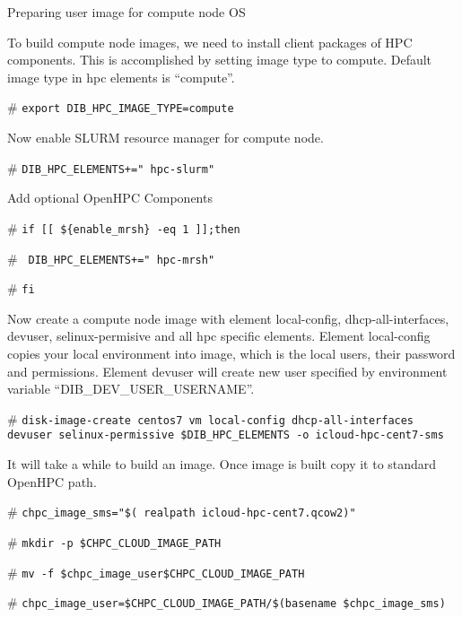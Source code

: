 \begin{section}
{Preparing user image for compute node OS

To build compute node images, we need to install client packages of HPC components. This is accomplished by setting image type to compute. Default image type in hpc elements is “compute”.

\begin{bash}[ctrlr]\# \texttt{\small{export DIB\_HPC\_IMAGE\_TYPE=compute}}\end{bash}

Now enable SLURM resource manager for compute node.

\begin{bash}[ctrlr]\# \texttt{\small{DIB\_HPC\_ELEMENTS+=" hpc-slurm"}}\end{bash}

Add optional OpenHPC Components

\begin{bash}[ctrlr]\# \texttt{\small{if [[ \$\{enable\_mrsh\} -eq 1 ]];then}}\end{bash}
\begin{bash}[ctrlr]\# \texttt{\small{       DIB\_HPC\_ELEMENTS+=" hpc-mrsh"}}\end{bash}
\begin{bash}[ctrlr]\# \texttt{\small{fi}}\end{bash}

Now create a compute node image with element local-config, dhcp-all-interfaces, devuser, selinux-permisive and all hpc specific elements. Element local-config copies your local environment into image, which is the local users, their password and permissions. Element devuser will create new user specified by environment variable “DIB\_DEV\_USER\_USERNAME”. 

\begin{bash}[ctrlr]\# \texttt{\small{disk-image-create centos7 vm local-config dhcp-all-interfaces devuser selinux-permissive \$DIB\_HPC\_ELEMENTS -o icloud-hpc-cent7-sms}}\end{bash}

It will take a while to build an image. Once image is built copy it to standard OpenHPC path.

\begin{bash}[ctrlr]\# \texttt{\small{chpc\_image\_sms="\$( realpath icloud-hpc-cent7.qcow2)"}}\end{bash}
\begin{bash}[ctrlr]\# \texttt{\small{mkdir -p \$CHPC\_CLOUD\_IMAGE\_PATH}}\end{bash}
\begin{bash}[ctrlr]\# \texttt{\small{mv -f \$chpc\_image\_user\$CHPC\_CLOUD\_IMAGE\_PATH}}\end{bash}
\begin{bash}[ctrlr]\# \texttt{\small{chpc\_image\_user=\$CHPC\_CLOUD\_IMAGE\_PATH/\$(basename \$chpc\_image\_sms)}}\end{bash}




}
\end{section}
